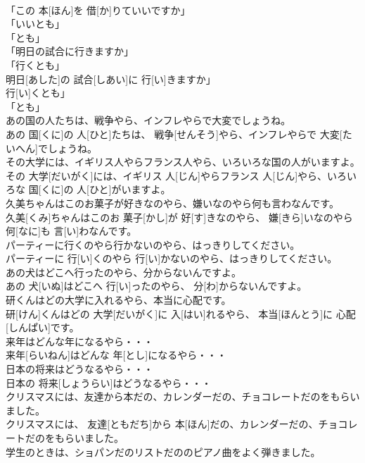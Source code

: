 \documentclass[8pt]{extreport}
\begin{document}
\begin{CJK}{UTF8}{min}
\\	「この 本[ほん]を 借[か]りていいですか」 
\\	「いいとも」	
\\	「とも」
\\	「明日の試合に行きますか」 
\\	「行くとも」	
\\	明日[あした]の 試合[しあい]に 行[い]きますか」 
\\	行[い]くとも」	
\\	「とも」
\\	あの国の人たちは、戦争やら、インフレやらで大変でしょうね。	
\\	あの 国[くに]の 人[ひと]たちは、 戦争[せんそう]やら、インフレやらで 大変[たいへん]でしょうね。	
\\	その大学には、イギリス人やらフランス人やら、いろいろな国の人がいますよ。	
\\	その 大学[だいがく]には、イギリス 人[じん]やらフランス 人[じん]やら、いろいろな 国[くに]の 人[ひと]がいますよ。	
\\	久美ちゃんはこのお菓子が好きなのやら、嫌いなのやら何も言わなんです。	
\\	久美[くみ]ちゃんはこのお 菓子[かし]が 好[す]きなのやら、 嫌[きら]いなのやら 何[なに]も 言[い]わなんです。	
\\	パーティーに行くのやら行かないのやら、はっきりしてください。	
\\	パーティーに 行[い]くのやら 行[い]かないのやら、はっきりしてください。	
\\	あの犬はどこへ行ったのやら、分からないんですよ。	
\\	あの 犬[いぬ]はどこへ 行[い]ったのやら、 分[わ]からないんですよ。	
\\	研くんはどの大学に入れるやら、本当に心配です。	
\\	研[けん]くんはどの 大学[だいがく]に 入[はい]れるやら、 本当[ほんとう]に 心配[しんぱい]です。	
\\	来年はどんな年になるやら・・・	
\\	来年[らいねん]はどんな 年[とし]になるやら・・・	
\\	日本の将来はどうなるやら・・・	
\\	日本の 将来[しょうらい]はどうなるやら・・・	
\\	クリスマスには、友達から本だの、カレンダーだの、チョコレートだのをもらいました。	
\\	クリスマスには、 友達[ともだち]から 本[ほん]だの、カレンダーだの、チョコレートだのをもらいました。	
\\	学生のときは、ショパンだのリストだののピアノ曲をよく弾きました。	

\end{CJK}
\end{document}
